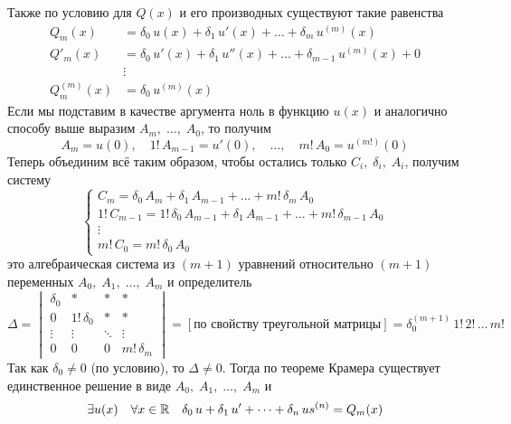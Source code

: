 \begin{Proof}
    Также по условию для $Q(x)$ и его производных существуют такие равенства
    \begin{align*}
        Q_m(x) &= \delta_0\,u(x) + \delta_1\,u'(x) + \dots + \delta_m\,u^{(m)}(x)\\
        Q'_m(x) &= \delta_0\,u'(x) + \delta_1\,u''(x) + \dots + \delta_{m-1}\,u^{(m)}(x) + 0\\
        &\vdots\\
        Q_m^{(m)}(x) &= \delta_0\,u^{(m)}(x)
    \end{align*}
    Если мы подставим в качестве аргумента ноль в функцию $u(x)$ и аналогично способу выше выразим $A_m,\; \dots,\; A_0$, то получим
    \[
        A_m=u(0),\quad 1!\,A_{m-1}=u'(0),\quad \dots,\quad m!\,A_0=u^{(m!)}(0)
    \]
    Теперь объединим всё таким образом, чтобы остались только $C_i,\; \delta_i,\; A_i$, получим систему
    \[
        \begin{cases}
            C_m=\delta_0\,A_m + \delta_1\,A_{m-1} + \dots + m!\,\delta_m\,A_0\\
            1!\,C_{m-1} = 1!\,\delta_0\,A_{m-1} + \delta_1\,A_{m-1} + \dots + m!\,\delta_{m-1}\,A_0\\
            \vdots\\
            m!\,C_0=m!\,\delta_0\,A_0
        \end{cases}
    \]
    это алгебраическая система из $(m+1)$ уравнений относительно $(m+1)$ переменных $A_0,\; A_1,\; \dots,\; A_m$ и определитель\\
    \[
        \Delta= 
        \begin{vmatrix} 
            \delta_0& *& *& *\\  
            0& 1!\,\delta_0& *& *\\ 
            \vdots& \vdots& \ddots& \vdots\\
            0&0&0&m!\,\delta_m
        \end{vmatrix} = [\text{по свойству треугольной матрицы}] = \delta_0^{(m+1)}\,1!\,2!\, \dots\,m!
    \]
    Так как $\delta_0 \neq 0$ (по условию), то $\Delta \neq 0$. Тогда по теореме Крамера существует единственное решение в виде $A_0,\; A_1,\; \dots,\; A_m$ и 
    \[
        \exists u(x) \quad \forall x \in \mathbb{R} \quad \delta_0\,u + \delta_1\,u' + \dots + \delta_n\,us^{(n)} = Q_m(x)
    \]\\
\end{Proof}

